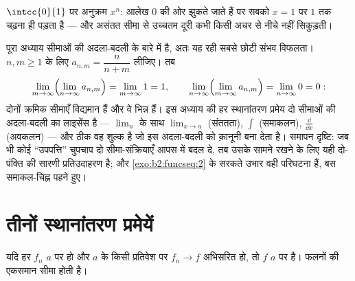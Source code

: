 \begin{omfigure}

{\small $\intcc{0}{1}$ पर अनुक्रम $x^n$: आलेख $0$ की ओर झुकते जाते हैं पर सबको $x = 1$ पर
$1$ तक चढ़ना ही पड़ता है --- और असंतत  सीमा से उच्चतम दूरी कभी
किसी अचर से नीचे नहीं सिकुड़ती।}
\end{omfigure}

\begin{example}\label{ex:b2:funcseq:doublelimit}
पूरा अध्याय सीमाओं की अदला-बदली के बारे में है, अतः यह रही सबसे छोटी
संभव विफलता। $n, m \geq 1$ के लिए $a_{n,m} = \dfrac{n}{n+m}$ लीजिए। तब
\[
\lim_{m\to\infty}\Bigl(\lim_{n\to\infty}a_{n,m}\Bigr)
= \lim_{m\to\infty} 1 = 1,
\qquad
\lim_{n\to\infty}\Bigl(\lim_{m\to\infty}a_{n,m}\Bigr)
= \lim_{n\to\infty} 0 = 0 :
\]
दोनों क्रमिक सीमाएँ विद्यमान हैं और वे भिन्न हैं। इस अध्याय की हर
स्थानांतरण प्रमेय दो सीमाओं की अदला-बदली का लाइसेंस है --- $\lim_n$ के साथ $\lim_{x\to a}$
(संततता), $\int$ (समाकलन), $\frac{\dd}{\dd x}$ (अवकलन) --- और  ठीक वह शुल्क है
जो इस अदला-बदली को क़ानूनी बना देता है। समापन दृष्टि: जब भी कोई ``उपपत्ति''
चुपचाप दो सीमा-संक्रियाएँ आपस में बदल दे, तब उसके सामने रखने के लिए यही
दो-पंक्ति की सारणी प्रतिउदाहरण है; और \cref{exo:b2:funcseq:2} के सरकते उभार वही परिघटना हैं,
बस समाकल-चिह्न पहने हुए।
\end{example}

\section{तीनों स्थानांतरण प्रमेयें}

\begin{theorem}[संततता]\label{thm:b2:funcseq:continuity}
यदि हर $f_n$ $a$ पर  हो और $a$ के किसी प्रतिवेश पर $f_n \to f$ 
अभिसरित हो, तो $f$ $a$ पर  है।  फलनों की एकसमान सीमा  होती
है।
\end{theorem}

